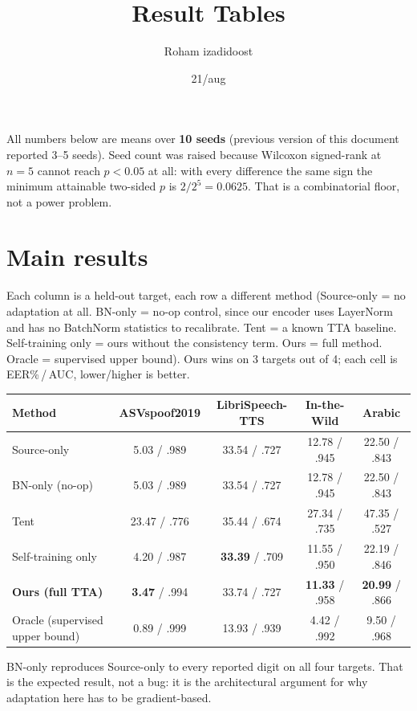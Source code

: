 \documentclass[11pt]{article}
\title{Result Tables}
\author{Roham izadidoost}
\date{21/aug}
\begin{document}
\maketitle

All numbers below are means over \textbf{10 seeds} (previous version of this
document reported 3--5 seeds). Seed count was raised because Wilcoxon
signed-rank at $n=5$ cannot reach $p<0.05$ at all: with every difference the
same sign the minimum attainable two-sided $p$ is $2/2^5 = 0.0625$. That is a
combinatorial floor, not a power problem.

\section*{Main results}
Each column is a held-out target, each row a different method
(Source-only = no adaptation at all. BN-only = no-op control, since our encoder
uses LayerNorm and has no BatchNorm statistics to recalibrate. Tent = a known
TTA baseline. Self-training only = ours without the consistency term. Ours =
full method. Oracle = supervised upper bound). Ours wins on 3 targets out of 4;
each cell is EER\%\,/\,AUC, lower/higher is better.
\begin{table}[h]
\centering
\begin{tabular}{@{}lcccc@{}}
\toprule
Method & ASVspoof2019 & LibriSpeech-TTS & In-the-Wild & Arabic \\
\midrule
Source-only & 5.03 / .989 & 33.54 / .727 & 12.78 / .945 & 22.50 / .843 \\
BN-only (no-op) & 5.03 / .989 & 33.54 / .727 & 12.78 / .945 & 22.50 / .843 \\
Tent & 23.47 / .776 & 35.44 / .674 & 27.34 / .735 & 47.35 / .527 \\
Self-training only & 4.20 / .987 & \textbf{33.39} / .709 & 11.55 / .950 & 22.19 / .846 \\
\rowcolor{green!12}\textbf{Ours (full TTA)} & \textbf{3.47} / .994 & 33.74 / .727 & \textbf{11.33} / .958 & \textbf{20.99} / .866 \\
\midrule
Oracle (supervised upper bound) & 0.89 / .999 & 13.93 / .939 & 4.42 / .992 & 9.50 / .968 \\
\bottomrule
\end{tabular}
\end{table}

BN-only reproduces Source-only to every reported digit on all four targets.
That is the expected result, not a bug: it is the architectural argument for
why adaptation here has to be gradient-based.
\end{document}
